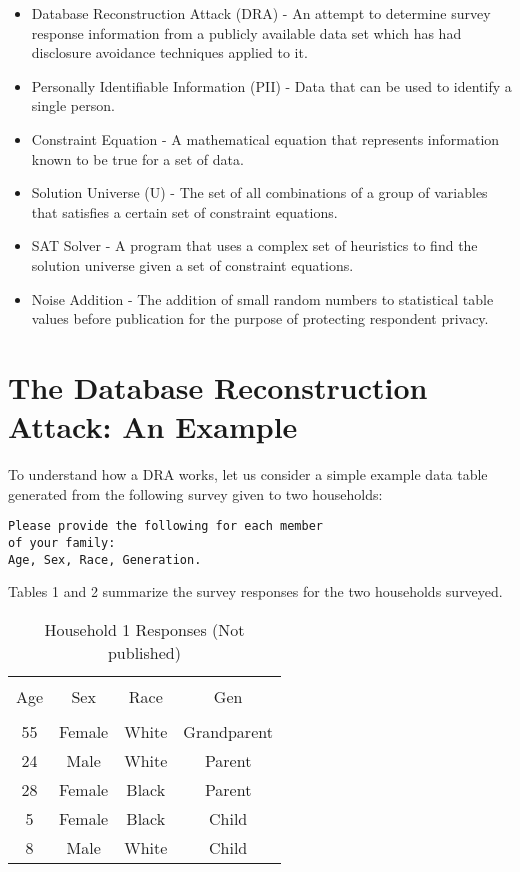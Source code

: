\documentclass[jou,apacite]{apa6}
\begin{document}
\begin{itemize}
\item Database Reconstruction Attack (DRA) - An attempt to determine survey response information from a publicly available data set which has had disclosure avoidance techniques applied to it.

\item Personally Identifiable Information (PII) - Data that can be used to identify a single person.

\item Constraint Equation - A mathematical equation that represents information known to be true for a set of data.

\item Solution Universe (U) - The set of all combinations of a
group of variables that satisfies a certain set of constraint equations.

\item SAT Solver - A program that uses a complex set of heuristics to find the solution universe given a set of constraint equations.

\item Noise Addition - The addition of small random numbers to statistical table values before publication for the purpose of protecting respondent privacy.
\end{itemize}

\section{The Database Reconstruction Attack: An Example}
To understand how a DRA works, let us consider a simple example data table generated from the following survey given to two households:
\begin{verbatim}
Please provide the following for each member
of your family:
Age, Sex, Race, Generation.
\end{verbatim}
Tables 1 and 2 summarize the survey responses for the two households surveyed.
\begin{table}[!htb]
\caption{Household 1 Responses (Not published)}\label{tab1}
\begin{tabular}{cccc}
\hline\\[-1.5ex]
Age & Sex & Race & Gen \\[0.5ex]
\hline\\[-1.5ex]
55 & Female & White & Grandparent\\[0.5ex]
24 & Male & White & Parent\\[0.5ex]
28 & Female & Black & Parent\\[0.5ex]
5 & Female & Black & Child\\[0.5ex]
8 & Male & White & Child\\[0.5ex]
\hline
\end{tabular}
\end{table}
\end{document}
